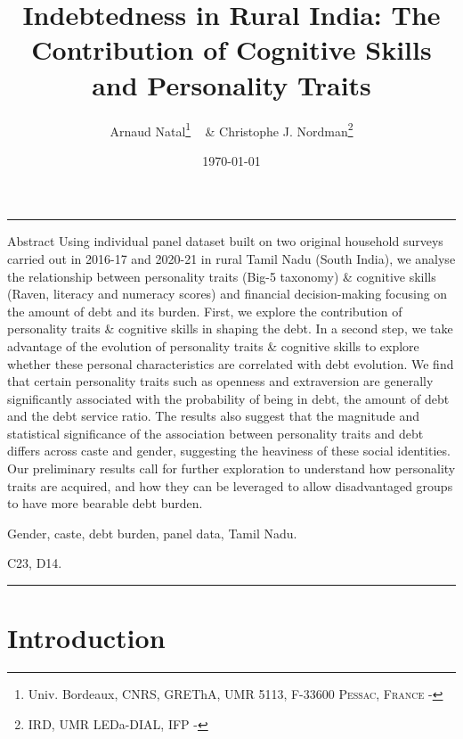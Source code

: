 \documentclass[a4paper, 11pt, onecolumn]{article}
\title{Indebtedness in Rural India: The Contribution of Cognitive Skills and Personality Traits}
\author{Arnaud Natal\thanks{Univ. Bordeaux, CNRS, GREThA, UMR 5113, F-33600 \textsc{Pessac, France} - \email{arnaud.natal@u-bordeaux.fr}} ~ \& Christophe J. Nordman\thanks{IRD, UMR LEDa-DIAL, IFP - \email{nordman@dial.prd}} }
\date{\today}
\begin{document}
\maketitle

\hrule 
\vspace{0.3cm}

\begin{resab}{Abstract}
Using individual panel dataset built on two original household surveys carried out in 2016-17 and 2020-21 in rural Tamil Nadu (South India), we analyse the relationship between personality traits (Big-5 taxonomy) \& cognitive skills (Raven, literacy and numeracy scores) and financial decision-making focusing on the amount of debt and its burden.
First, we explore the contribution of personality traits \& cognitive skills in shaping the debt.
In a second step, we take advantage of the evolution of personality traits \& cognitive skills to explore whether these personal characteristics are correlated with debt evolution. 
We find that certain personality traits such as openness and extraversion are generally significantly associated with the probability of being in debt, the amount of debt and the debt service ratio. 
The results also suggest that the magnitude and statistical significance of the association between personality traits and debt differs across caste and gender, suggesting the heaviness of these social identities.
Our preliminary results call for further exploration to understand how personality traits are acquired, and how they can be leveraged to allow disadvantaged groups to have more bearable debt burden.
\end{resab}

\begin{keywords}
Gender, caste, debt burden, panel data, Tamil Nadu.
\end{keywords}

\begin{jelcodes}
C23, D14.
\end{jelcodes}

\hrule

\clearpage
\newpage
\section{Introduction}
\label{Introduction}
\end{document}
